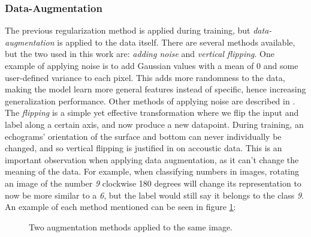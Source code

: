 \subsubsection{Data-Augmentation}
    The previous regularization method is applied during training, but \textit{data-augmentation} is applied to the data itself\cite{kukavcka2017_regularization}. There are several methods available, but the two used in this work are: \textit{adding noise} and \textit{vertical flipping}. One example of applying noise is to add Gaussian values with a mean of 0 and some user-defined variance to each pixel. This adds more randomness to the data, making the model learn more general features instead of specific, hence increasing generalization performance. Other methods of applying noise are described in \citeauthor{kukavcka2017_regularization}\cite{kukavcka2017_regularization}. The \textit{flipping} is a simple yet effective transformation where we flip the input and label along a certain axis, and now produce a new datapoint. During training, an echograms' orientation of the surface and bottom can never individually be changed, and so vertical flipping is justified in on accoustic data. This is an important observation when applying data augmentation, as it can't change the meaning of the data. For example, when classifying numbers in images, rotating an image of the number \textit{9} clockwise 180 degrees will change its representation to now be more similar to a \textit{6}, but the label would still say it belongs to the class \textit{9}. An example of each method mentioned can be seen in figure \ref{data augmentation fig}:
    
    \begin{figure}[H]
        \centering
        
        
        
        
        \caption[Two data augmentation examples]{Two augmentation methods applied to the same image.}
        \label{data augmentation fig}
        
        \end{figure}
    
    
\clearpage
